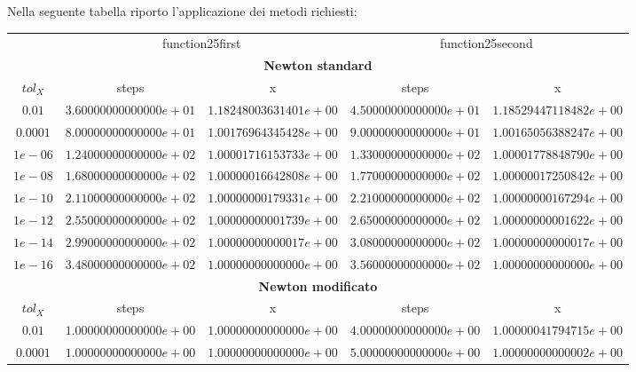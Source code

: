Nella seguente tabella riporto l'applicazione dei metodi richiesti:
\begin{center}
\begin{tabular}{|c|c|c||c|c|}
\cline{2-5}
 \multicolumn{1}{c}{} &
 \multicolumn{2}{|c||}{function25first} &
 \multicolumn{2}{c|}{function25second}
 \\
\cline{2-5}
	\multicolumn{5}{c}{\textbf{Newton standard}} \\
\hline
	$tol_{X}$ & steps & x & steps & x \\
\hline
	$0.01$ & $3.60000000000000e+01$ & $1.18248003631401e+00$ &
	$4.50000000000000e+01$ & $1.18529447118482e+00$ \\
		
	$0.0001$ & $8.00000000000000e+01$ & $1.00176964345428e+00$ & 
	$9.00000000000000e+01$ & $1.00165056388247e+00$ \\

	$1e-06$ & $1.24000000000000e+02$ & $1.00001716153733e+00$ &
	$1.33000000000000e+02$ & $1.00001778848790e+00$ \\

	$1e-08$ & $1.68000000000000e+02$ & $1.00000016642808e+00$ & 
	$1.77000000000000e+02$ & $1.00000017250842e+00$ \\ 

	$1e-10$ & $2.11000000000000e+02$ & $1.00000000179331e+00$ & 
	$2.21000000000000e+02$ & $1.00000000167294e+00$ \\

	$1e-12$ & $2.55000000000000e+02$ & $1.00000000001739e+00$ & 
	$2.65000000000000e+02$ & $1.00000000001622e+00$ \\

	$1e-14$ & $2.99000000000000e+02$ & $1.00000000000017e+00$ &
	$3.08000000000000e+02$ & $1.00000000000017e+00$ \\

	$1e-16$ & $3.48000000000000e+02$ & $1.00000000000000e+00$ & 
	$3.56000000000000e+02$ & $1.00000000000000e+00$ \\ 
\hline
	\multicolumn{5}{c}{\textbf{Newton modificato}} \\
\hline
	$tol_{X}$ & steps & x & steps & x \\
\hline
	$0.01$ & $1.00000000000000e+00$ & $1.00000000000000e+00$ &
	$4.00000000000000e+00$ & $1.00000041794715e+00$ \\
		
	$0.0001$ & $1.00000000000000e+00$ & $1.00000000000000e+00$ & 
	$5.00000000000000e+00$ & $1.00000000000002e+00$ \\


\end{tabular}
\end{center}
